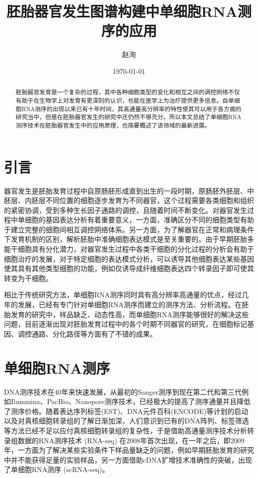 \documentclass[lang=cn]{elegantpaper}
\title{胚胎器官发生图谱构建中单细胞RNA测序的应用}
\author{赵洵}
\institute{中国科学院大学}
\date{\today}
\begin{document}
\maketitle

\begin{abstract}
胚胎器官发育是一个复杂的过程，其中各种细胞类型的变化和相互之间的调控网络不仅有助于在生物学上对发育有更深刻的认识，也能在医学上为治疗提供更多信息。自单细胞RNA测序的出现以来已有十年时间，其高通量高分辨率的特性使其可以用于各方面的研究当中，但是在胚胎器官发生的研究中还仍然不够充分。所以本文总结了单细胞RNA测序技术在胚胎器官发生中的应用原理，也简要概述了该领域的最新进展。
\end{abstract}

\section{引言}
器官发生是胚胎发育过程中自原肠胚形成直到出生的一段时期\citep{gilbert_developmental_2017}，原肠胚外胚层、中胚层、内胚层不同位置的细胞逐步发育为不同器官，这个过程需要各类细胞和组织的紧密协调，受到多种生长因子通路的调控，且随着时间不断变化\citep{zorn_vertebrate_2009}。对器官发生过程中单细胞的基因表达分析有着重要意义，一方面，准确区分不同的细胞类型有助于建立完整的细胞间相互调控网络体系\citep{dong_single-cell_2018}。另一方面，为了解器官在正常和病理条件下发育机制的区别，解析胚胎中准确细胞表达模式是至关重要的\citep{belle_tridimensional_2017}。由于早期胚胎多能干细胞具有分化潜力，对器官发生过程中各类干细胞的分化过程的分析会有助于细胞治疗的发展\citep{lancaster_organogenesis_2014}，对于特定细胞的表达模式分析，可以诱导其他细胞表达某些基因使其具有其他类型细胞的功能，例如仅诱导成纤维细胞表达四个转录因子即可使其转变为干细胞\citep{takahashi_induction_2006}。

相比于传统研究方法，单细胞RNA测序同时具有高分辨率高通量的优点，经过几年的发展，已经有专门针对单细胞RNA测序而建立的测序方法、分析流程。在胚胎发育的研究中，样品缺乏、动态性高，而单细胞RNA测序能够很好的解决这些问题，目前逐渐出现对胚胎发育过程中的各个时期不同器官的研究，在细胞标记基因、调控通路、分化路径等方面有了不错的成果。

\section{单细胞RNA测序}
DNA测序技术在40年来快速发展，从最初的Sanger测序到现在第二代和第三代例如Ilummina、PacBio、Nanopore测序技术，已经极大的提高了测序通量并且降低了测序价格\citep{shendure_dna_2017}。随着表达序列标签(EST)、DNA元件百科(ENCODE)等计划的启动以及对真核细胞转录组的了解日渐加深\citep{birney_identification_2007}，人们意识到已有的DNA阵列、标签筛选等方法已经不足以应付真核细胞转录组的复杂性，于是借助高通量测序技术分析转录组数据的RNA测序技术 (RNA-seq) 在2008年首次出现\citep{cloonan_stem_2008}，在一年之后，即2009年，一方面为了解决某些实验条件下样品量缺乏的问题，例如早期胚胎发育的研究中并不能获得足量的实验样品，另一方面借助cDNA扩增技术准确性的突破，出现了单细胞RNA测序 (scRNA-seq)\citep{tang_mrna-seq_2009}。
\end{document}
